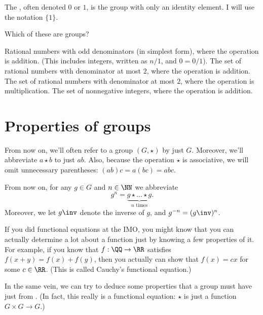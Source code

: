 \begin{example}
	The , often denoted $0$ or $1$,
	is the group with only an identity element.
	I will use the notation $\{1\}$.
\end{example}

\begin{exercise}
	Which of these are groups?
	\begin{enumerate}[(a)]
		\ii Rational numbers with odd denominators (in simplest form), where the operation is addition.
		(This includes integers, written as $n/1$, and $0 = 0/1$).
		\ii The set of rational numbers with denominator at most $2$, where the operation is addition.
		\ii The set of rational numbers with denominator at most $2$, where the operation is multiplication.
		\ii The set of nonnegative integers, where the operation is addition.
	\end{enumerate}
\end{exercise}


\section{Properties of groups}
\begin{abuse}
	From now on, we'll often refer to a group $(G, \star)$ by just $G$.
	Moreover, we'll abbreviate $a \star b$ to just $ab$.
	Also, because the operation $\star$ is associative,
	we will omit unnecessary parentheses: $(ab)c = a(bc) = abc$.
\end{abuse}
\begin{abuse}
	From now on, for any $g \in G$ and $n \in \NN$ we abbreviate
	\[ g^n
		=
		\underbrace{g \star \dots \star g}_{\text{$n$ times}}.\]
	Moreover, we let $g\inv$ denote the inverse of $g$,
	and $g^{-n} = (g\inv)^n$.
\end{abuse}

If you did functional equations at the IMO, you might know that you can actually determine a lot about a function just by knowing a few properties of it.
For example, if you know that $f : \QQ \to \RR$ satisfies $f(x+y) = f(x) + f(y)$, then you actually can show that $f(x) = cx$ for some $c \in \RR$.
(This is called Cauchy's functional equation.)

In the same vein, we can try to deduce some properties that a group must have just from .
(In fact, this really is a functional equation: $\star$ is just a function $G \times G \to G$.)

